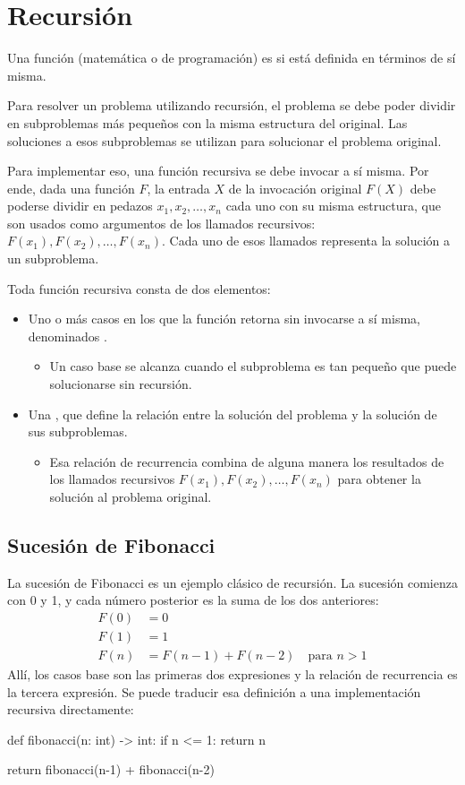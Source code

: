 \section{Recursión}

Una función (matemática o de programación) es  si está definida en términos de sí misma.

Para resolver un problema utilizando recursión, el problema se debe poder dividir en subproblemas más pequeños con la misma estructura del original. Las soluciones a esos subproblemas se utilizan para solucionar el problema original. 

Para implementar eso, una función recursiva se debe invocar a sí misma. Por ende, dada una función \(F\), la entrada \(X\) de la invocación original \(F(X)\) debe poderse dividir en pedazos \(x_1, x_2, \ldots, x_n\) cada uno con su misma estructura, que son usados como argumentos de los llamados recursivos: \(F(x_1), F(x_2), \ldots, F(x_n)\). Cada uno de esos llamados representa la solución a un subproblema.

Toda función recursiva consta de dos elementos:
\begin{itemize}
  \item Uno o más casos en los que la función retorna sin invocarse a sí misma, denominados .
  \begin{itemize}
    \item Un caso base se alcanza cuando el subproblema es tan pequeño que puede solucionarse sin recursión.
  \end{itemize}
  \item  Una , que define la relación entre la solución del problema y la solución de sus subproblemas.
  \begin{itemize}
    \item Esa relación de recurrencia combina de alguna manera los resultados de los llamados recursivos \(F(x_1), F(x_2), \ldots, F(x_n)\) para obtener la solución al problema original.
  \end{itemize}
\end{itemize}

\subsection{Sucesión de Fibonacci}

La sucesión de Fibonacci es un ejemplo clásico de recursión. La sucesión comienza con 0 y 1, y cada número posterior es la suma de los dos anteriores:
\begin{align*}
    F(0) &= 0 \\
    F(1) &= 1 \\
    F(n) &= F(n-1) + F(n-2) \quad \text{para } n > 1
\end{align*}
Allí, los casos base son las primeras dos expresiones y la relación de recurrencia es la tercera expresión. Se puede traducir esa definición a una implementación recursiva directamente:
\begin{pseudocode}
def fibonacci(n: int) -> int:
    if n <= 1: 
        return n

    return fibonacci(n-1) + fibonacci(n-2)
\end{pseudocode}

